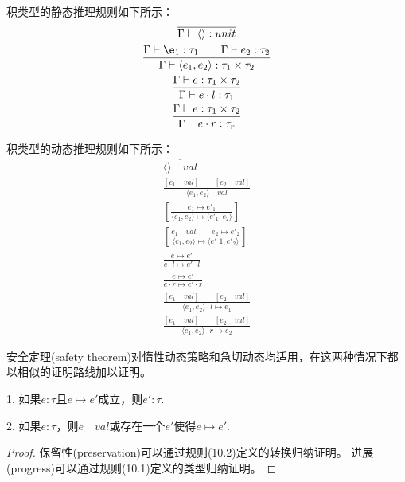 
积类型的静态推理规则如下所示：
\begin{subequations}
    \begin{gather}
    \overline{\Gamma \vdash \langle \rangle : unit} \\
    \frac{\Gamma \vdash \e_1: \tau_1 \qquad \Gamma \vdash e_2 : \tau_2}
    {\Gamma \vdash \langle e_1,e_2 \rangle : \tau_1 \times \tau_2} \\
    \frac{\Gamma \vdash e : \tau_1 \times \tau_2}
    {\Gamma \vdash e \cdot l : \tau_1} \\
    \frac{\Gamma \vdash e : \tau_1 \times \tau_2}
    {\Gamma \vdash e \cdot r : \tau_r} 
    \end{gather}
\end{subequations}

积类型的动态推理规则如下所示：
\begin{subequations}
    \begin{gather}
    \overline{\langle \rangle \quad val} \\
    \frac{[e_1 \quad val] \qquad [e_2 \quad val]}
    {\langle e_1, e_2 \rangle \quad val} \\
    \left[\frac{e_1 \mapsto e'_{1} }
    {\langle e_1, e_2 \rangle \mapsto \langle e'_{1}, e_2 \rangle}
    \right] \\
    \left[\frac{e_1 \quad val \qquad e_2 \mapsto e'_{2} }
    {\langle e_1, e_2 \rangle \mapsto \langle e'\_{1}, e'_2 \rangle}
    \right] \\
    \frac{e \mapsto e'}{e \cdot l \mapsto e' \cdot l} \\
    \frac{e \mapsto e'}{e \cdot r \mapsto e' \cdot r} \\
    \frac{[e_1 \quad val] \qquad [e_2 \quad val]}
    {\langle e_1, e_2 \rangle \cdot l \mapsto e_1} \\
    \frac{[e_1 \quad val] \qquad [e_2 \quad val]}
    {\langle e_1, e_2 \rangle \cdot r \mapsto e_2} 
    \end{gather}
\end{subequations}


安全定理(safety theorem)对惰性动态策略和急切动态均适用，在这两种情况下都以相似的证明路线加以证明。

\begin{theorem}[安全定理]\label{theorem:safety}
1. 如果$e:\tau$且$e\mapsto e'$成立，则$e':\tau$.

2. 如果$e:\tau$，则$e\quad val$或存在一个$e'$使得$e\mapsto e'$.
\end{theorem}
\begin{proof}
保留性(preservation)可以通过规则(10.2)定义的转换归纳证明。
进展(progress)可以通过规则(10.1)定义的类型归纳证明。
\end{proof}

